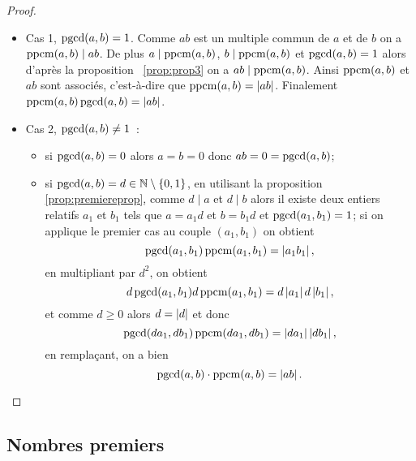 \begin{proof}
  \begin{itemize}
    \item Cas 1, \(\operatorname{pgcd}(a,b)=1\). Comme \(ab\) est un multiple commun de \(a\) 
      et de \(b\) on a \(\operatorname{ppcm}(a,b) \mid ab\). De plus \(a \mid \operatorname{ppcm}(a,b)\), 
      \(b \mid \operatorname{ppcm}(a,b)\) et \(\operatorname{pgcd}(a,b)=1\) alors d'après la proposition~
      \ref{prop:prop3} on a \(ab \mid \operatorname{ppcm}(a,b)\). Ainsi \(\operatorname{ppcm}(a,b)\) et 
      \(ab\) sont associés, c'est-à-dire que \(\operatorname{ppcm}(a,b)=\left\lvert ab\right\rvert\). Finalement  
      \(\operatorname{ppcm}(a,b)\operatorname{pgcd}(a,b)=\left\lvert ab\right\rvert\).
    \item Cas 2, \(\operatorname{pgcd}(a,b) \neq 1\)~:
      \begin{itemize}
        \item si \(\operatorname{pgcd}(a,b) = 0\) alors \(a=b=0\) donc \(ab=0=\operatorname{pgcd}(a,b)\);
        \item si \(\operatorname{pgcd}(a,b)=d \in \mathbb{N}\setminus\{0,1\}\), en utilisant la 
          proposition~
          \ref{prop:premiereprop}, comme \(d  \mid a\) et \(d \mid b\) alors il 
          existe deux entiers relatifs \(a_1\) et \(b_1\) tels que \(a=a_1 d\) 
          et \(b=b_1d\) et \(\operatorname{pgcd}(a_1,b_1)=1\); si on applique le premier cas 
          au couple \((a_1,b_1)\) on obtient
          \begin{equation}
            \operatorname{pgcd}(a_1,b_1) \operatorname{ppcm}(a_1,b_1) = \left\lvert a_1b_1\right\rvert,
          \end{equation}
          en multipliant par \(d^2\), on obtient
          \begin{equation}
            d\operatorname{pgcd}(a_1,b_1) d\operatorname{ppcm}(a_1,b_1) = d\left\lvert a_1\right\rvert d\left\lvert b_1\right\rvert,
          \end{equation}
          et comme \(d\geqslant 0\) alors \(d=\left\lvert d\right\rvert\) et donc    
          \begin{equation}
            \operatorname{pgcd}(da_1,db_1) \operatorname{ppcm}(da_1,db_1) = \left\lvert da_1\right\rvert \left\lvert db_1\right\rvert,
          \end{equation}
          en remplaçant, on a bien
          \begin{equation}
            \operatorname{pgcd}(a,b) \cdot \operatorname{ppcm}(a,b)= \left\lvert ab\right\rvert.
          \end{equation}
      \end{itemize}
  \end{itemize}
\end{proof}

\subsection{Nombres premiers}

